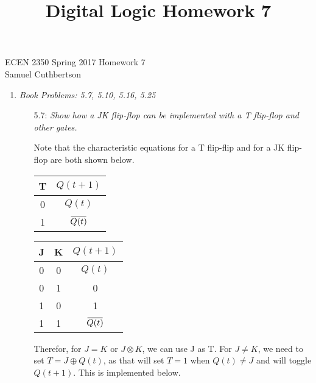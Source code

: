 \documentclass[12pt]{article}
\newcommand{\overbar}[1]
    {\mkern1.5mu\overline{\mkern-1.5mu#1\mkern-1.5mu}\mkern1.5mu}
\begin{document}
\makeatother

\title{Digital Logic Homework 7}

ECEN 2350 Spring 2017 \hfill Homework 7\\
Samuel Cuthbertson

\hrulefill{}
\begin{enumerate}
  \item \textit{Book Problems: 5.7, 5.10, 5.16, 5.25}
  \begin{enumerate}
    \item[5.7:] \textit{Show how a JK flip-flop can be implemented with a T
                        flip-flop and other gates.}

      \vspace{3mm}
      Note that the characteristic equations for a T flip-flip and for a JK
        flip-flop are both shown below.
      \begin{center}
        \begin{minipage}{0.4\textwidth}
          \begin{center}
            \begin{tabular}{c | c}
                  T & $Q(t+1)$ \\
                  \hline
                  0 & $Q(t)$ \\
                  1 & $\overbar{Q(t)}$
            \end{tabular}
          \end{center}
        \end{minipage}
        \hfill
        \begin{minipage}{0.4\textwidth}
          \begin{center}
            \begin{tabular}{c c | c}
                  J & K & $Q(t+1)$ \\
                  \hline
                  0 & 0 & $Q(t)$ \\
                  0 & 1 & 0 \\
                  1 & 0 & 1 \\
                  1 & 1 & $\overbar{Q(t)}$
            \end{tabular}
        \end{center}
        \end{minipage}
      \end{center}
      \vspace{3mm}
      Therefor, for $J = K$ or $J \otimes K$, we can use J as T. For $J\neq K$,
        we need to set $T = J \oplus Q(t)$, as that will set $T=1$ when
        $Q(t) \neq J$ and will toggle $Q(t+1)$. This is implemented below.
      \begin{center}
\end{center}
\end{enumerate}
\end{enumerate}
\end{document}
